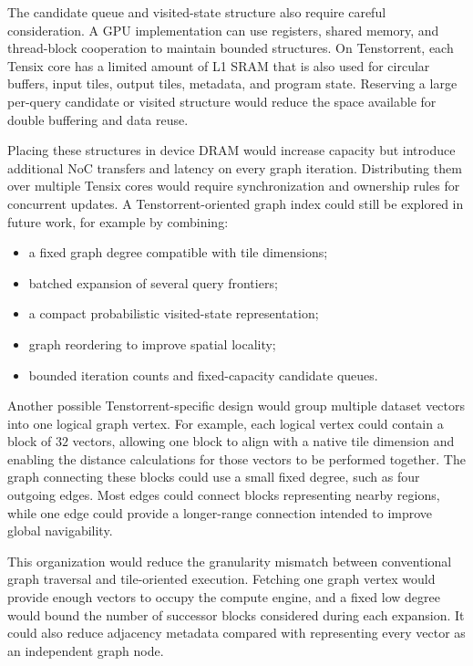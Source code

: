 The candidate queue and visited-state structure also require careful consideration. A GPU implementation can use registers, shared memory, and thread-block cooperation to maintain bounded structures. On Tenstorrent, each Tensix core has a limited amount of L1 SRAM that is also used for circular buffers, input tiles, output tiles, metadata, and program state. Reserving a large per-query candidate or visited structure would reduce the space available for double buffering and data reuse.

Placing these structures in device DRAM would increase capacity but introduce additional NoC transfers and latency on every graph iteration. Distributing them over multiple Tensix cores would require synchronization and ownership rules for concurrent updates.
\newline
A Tenstorrent-oriented graph index could still be explored in future work, for example by combining:
\begin{itemize}
\item a fixed graph degree compatible with tile dimensions;
\item batched expansion of several query frontiers;
\item a compact probabilistic visited-state representation;
\item graph reordering to improve spatial locality;
\item bounded iteration counts and fixed-capacity candidate queues.
\end{itemize}

Another possible Tenstorrent-specific design would group multiple dataset vectors into one logical graph vertex. For example, each logical vertex could contain a block of \(32\) vectors, allowing one block to align with a native tile dimension and enabling the distance calculations for those vectors to be performed together. The graph connecting these blocks could use a small fixed degree, such as four outgoing edges. Most edges could connect blocks representing nearby regions, while one edge could provide a longer-range connection intended to improve global navigability.

This organization would reduce the granularity mismatch between conventional graph traversal and tile-oriented execution. Fetching one graph vertex would provide enough vectors to occupy the compute engine, and a fixed low degree would bound the number of successor blocks considered during each expansion. It could also reduce adjacency metadata compared with representing every vector as an independent graph node.

